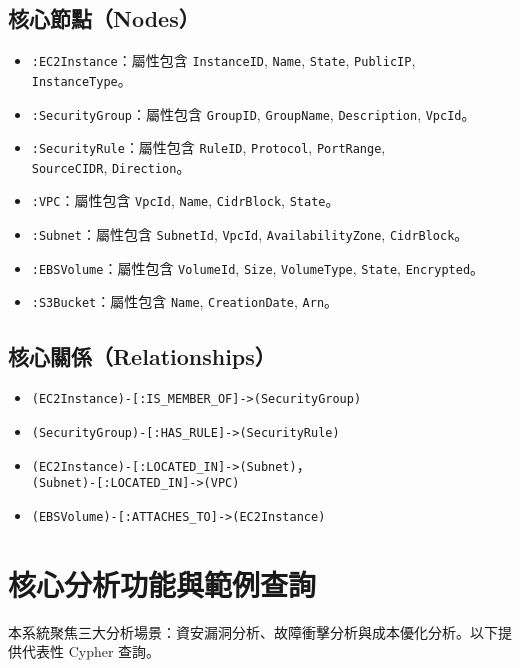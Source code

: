 \documentclass[11pt,a4paper]{ctexart}
\begin{document}
\subsection{核心節點（Nodes）}
\begin{itemize}[leftmargin=1.5em]
    \item \texttt{:EC2Instance}：屬性包含 \texttt{InstanceID}, \texttt{Name}, \texttt{State}, \texttt{PublicIP}, \texttt{InstanceType}。
    \item \texttt{:SecurityGroup}：屬性包含 \texttt{GroupID}, \texttt{GroupName}, \texttt{Description}, \texttt{VpcId}。
    \item \texttt{:SecurityRule}：屬性包含 \texttt{RuleID}, \texttt{Protocol}, \texttt{PortRange}, \\
          \texttt{SourceCIDR}, \texttt{Direction}。
    \item \texttt{:VPC}：屬性包含 \texttt{VpcId}, \texttt{Name}, \texttt{CidrBlock}, \texttt{State}。
    \item \texttt{:Subnet}：屬性包含 \texttt{SubnetId}, \texttt{VpcId}, \texttt{AvailabilityZone}, \texttt{CidrBlock}。
    \item \texttt{:EBSVolume}：屬性包含 \texttt{VolumeId}, \texttt{Size}, \texttt{VolumeType}, \texttt{State}, \texttt{Encrypted}。
    \item \texttt{:S3Bucket}：屬性包含 \texttt{Name}, \texttt{CreationDate}, \texttt{Arn}。
\end{itemize}

\subsection{核心關係（Relationships）}
\begin{itemize}[leftmargin=1.5em]
    \item \texttt{(EC2Instance)-[:IS\_MEMBER\_OF]->(SecurityGroup)}
    \item \texttt{(SecurityGroup)-[:HAS\_RULE]->(SecurityRule)}
    \item \texttt{(EC2Instance)-[:LOCATED\_IN]->(Subnet)}，\\
          \texttt{(Subnet)-[:LOCATED\_IN]->(VPC)}
    \item \texttt{(EBSVolume)-[:ATTACHES\_TO]->(EC2Instance)}
\end{itemize}

\section{核心分析功能與範例查詢}
本系統聚焦三大分析場景：資安漏洞分析、故障衝擊分析與成本優化分析。以下提供代表性 Cypher 查詢。
\end{document}
